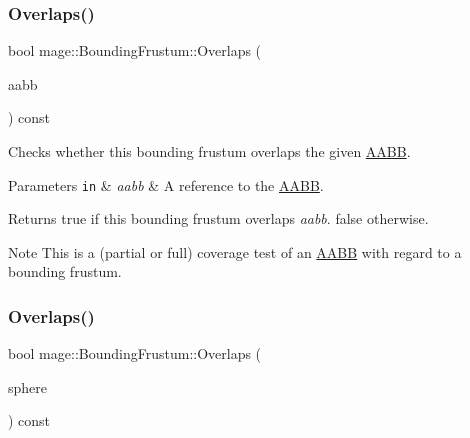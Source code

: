 \subsubsection{\texorpdfstring{Overlaps()}{Overlaps()}\hspace{0.1cm}{\footnotesize\ttfamily [1/2]}}
{\footnotesize\ttfamily bool mage\+::\+Bounding\+Frustum\+::\+Overlaps (\begin{DoxyParamCaption}\item[{const \mbox{\hyperlink{classmage_1_1_a_a_b_b}{A\+A\+BB}} \&}]{aabb }\end{DoxyParamCaption}) const\hspace{0.3cm}{\ttfamily [noexcept]}}

Checks whether this bounding frustum overlaps the given \mbox{\hyperlink{classmage_1_1_a_a_b_b}{A\+A\+BB}}.


\begin{DoxyParams}[1]{Parameters}
\mbox{\tt in}  & {\em aabb} & A reference to the \mbox{\hyperlink{classmage_1_1_a_a_b_b}{A\+A\+BB}}. \\
\hline
\end{DoxyParams}
\begin{DoxyReturn}{Returns}
{\ttfamily true} if this bounding frustum overlaps {\itshape aabb}. {\ttfamily false} otherwise. 
\end{DoxyReturn}
\begin{DoxyNote}{Note}
This is a (partial or full) coverage test of an \mbox{\hyperlink{classmage_1_1_a_a_b_b}{A\+A\+BB}} with regard to a bounding frustum. 
\end{DoxyNote}
\mbox{\label{classmage_1_1_bounding_frustum_a2133c3a7187369772e82b7e229b0e683}} 
\subsubsection{\texorpdfstring{Overlaps()}{Overlaps()}\hspace{0.1cm}{\footnotesize\ttfamily [2/2]}}
{\footnotesize\ttfamily bool mage\+::\+Bounding\+Frustum\+::\+Overlaps (\begin{DoxyParamCaption}\item[{const \mbox{\hyperlink{classmage_1_1_bounding_sphere}{Bounding\+Sphere}} \&}]{sphere }\end{DoxyParamCaption}) const\hspace{0.3cm}{\ttfamily [noexcept]}}


